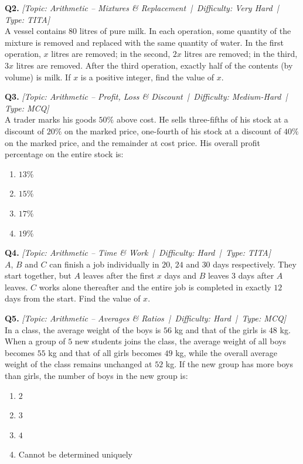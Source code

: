 \documentclass[11pt,a4paper]{article}
\newcommand{\qhead}[4]{\vspace{0.4em}\noindent\textbf{Q#1.} \textit{[Topic: #2 \,|\, Difficulty: #3 \,|\, Type: #4]}\\[0.15em]}
\begin{document}
\qhead{2}{Arithmetic -- Mixtures \& Replacement}{Very Hard}{TITA}
A vessel contains $80$ litres of pure milk. In each operation, some quantity of the mixture is removed and replaced with the same quantity of water. In the first operation, $x$ litres are removed; in the second, $2x$ litres are removed; in the third, $3x$ litres are removed. After the third operation, exactly half of the contents (by volume) is milk. If $x$ is a positive integer, find the value of $x$.

\qhead{3}{Arithmetic -- Profit, Loss \& Discount}{Medium-Hard}{MCQ}
A trader marks his goods $50\%$ above cost. He sells three-fifths of his stock at a discount of $20\%$ on the marked price, one-fourth of his stock at a discount of $40\%$ on the marked price, and the remainder at cost price. His overall profit percentage on the entire stock is:
\begin{enumerate}[label=(\Alph*),leftmargin=2em]
    \item $13\%$
    \item $15\%$
    \item $17\%$
    \item $19\%$
\end{enumerate}

\qhead{4}{Arithmetic -- Time \& Work}{Hard}{TITA}
$A$, $B$ and $C$ can finish a job individually in $20$, $24$ and $30$ days respectively. They start together, but $A$ leaves after the first $x$ days and $B$ leaves $3$ days after $A$ leaves. $C$ works alone thereafter and the entire job is completed in exactly $12$ days from the start. Find the value of $x$.

\qhead{5}{Arithmetic -- Averages \& Ratios}{Hard}{MCQ}
In a class, the average weight of the boys is $56$ kg and that of the girls is $48$ kg. When a group of $5$ new students joins the class, the average weight of all boys becomes $55$ kg and that of all girls becomes $49$ kg, while the overall average weight of the class remains unchanged at $52$ kg. If the new group has more boys than girls, the number of boys in the new group is:
\begin{enumerate}[label=(\Alph*),leftmargin=2em]
    \item $2$
    \item $3$
    \item $4$
    \item Cannot be determined uniquely
\end{enumerate}
\end{document}
